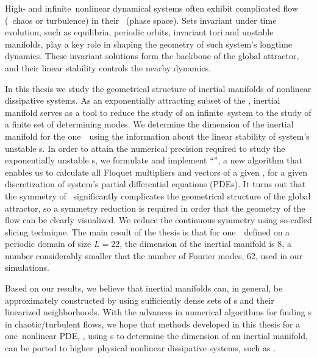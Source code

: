 

High- and infinite\dmn\ nonlinear dynamical systems often exhibit
complicated flow (\spt\ chaos or turbulence) in their \statesp\
(phase space).
Sets invariant under time evolution, such as equilibria, periodic orbits,
invariant tori and unstable manifolds, play a key role in shaping the
geometry of such system's longtime dynamics. These invariant solutions
form the backbone of the
global attractor, and their linear stability controls the nearby dynamics.

In this thesis we study the geometrical structure of inertial manifolds of
nonlinear dissipative systems. As an exponentially attracting subset of the
\statesp, inertial manifold serves as a tool to reduce the study of an
infinite\dmn\ system to the study of a finite set of determining
modes.
We determine the dimension of the inertial manifold for the one\dmn\
\KSe\ using the information about the linear stability of system's unstable
\po s.
In order to attain the numerical precision required to study the exponentially
unstable \po s, we
formulate and implement ``\ped'', a new algorithm that enables us
to calculate all Floquet multipliers and vectors of a given \po, for a given
discretization of system's partial differential equations (PDEs).
It turns out that the \On{2} symmetry of \KSe\ significantly complicates
the geometrical structure of the global attractor, so a symmetry reduction
is required in order that the geometry of the flow can be clearly
visualized. We reduce the continuous symmetry using so-called slicing
technique.
The main result of the thesis is that for one\dmn\ \KSe\ defined on a
periodic domain of size $L=22$, the dimension of the inertial manifold is 8,
a number considerably smaller that the number of Fourier modes, 62, used in our simulations.

Based on our results, we believe that inertial manifolds can, in general,
be approximately constructed by using sufficiently dense sets of \po s and
their linearized neighborhoods.
With the advances in numerical algorithms for finding \po s in
chaotic/turbulent flows, we hope that methods developed in this thesis for a
one\dmn\ nonlinear PDE, \ie, using \po s to
determine the dimension of an inertial manifold, can be ported to
higher\dmn\ physical nonlinear dissipative systems, such as \NSe.
